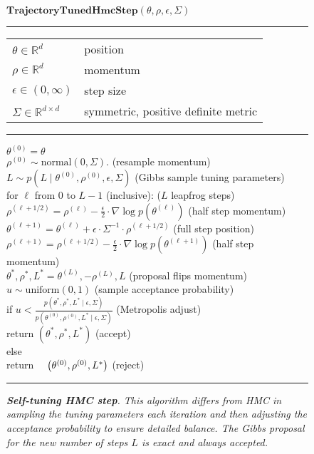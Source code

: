 \documentclass[ejs]{imsart}
\theoremstyle{plain}%
\theoremstyle{remark}
\begin{document}
\newcommand{\pos}[2]{#1^{(#2)}}
\begin{figure}
\begin{flushleft}
$\textbf{TrajectoryTunedHmcStep}(\theta, \rho, \epsilon, \Sigma)$
\vspace*{2pt}
\hrule
\vspace*{2pt}
\begin{tabular}{ll}
$\theta \in \mathbb{R}^d$ & position
\\[2pt]
$\rho \in \mathbb{R}^d$ & momentum
\\[2pt]
$\epsilon \in (0, \infty)$ & step size
\\[2pt]
$\Sigma \in \mathbb{R}^{d \times d}$ & symmetric, positive definite metric
\end{tabular}
\vspace*{2pt}
\hrule
\vspace*{6pt}
$\pos{\theta}{0} = \theta$
\\[4pt]
$\pos{\rho}{0} \sim \textrm{normal}(0, \Sigma).$ \hfill (resample momentum)
\\[4pt]
$L \sim p(L \mid \pos{\theta}{0}, \pos{\rho}{0}, \epsilon, \Sigma)$ \hfill (Gibbs sample tuning parameters)
\\[4pt]
for $\ell$ from $0$ to $L - 1$ (inclusive):  \hfill ($L$ leapfrog steps)
\\[-4pt]
\null \qquad $\pos{\rho}{\ell + 1/2} = \pos{\rho}{\ell} - \frac{\epsilon}{2} \cdot \nabla \log p(\pos{\theta}{\ell})$ \hfill (half step momentum)
\\[-4pt]
\null \qquad $\pos{\theta}{\ell + 1} = \pos{\theta}{\ell} + \epsilon \cdot \Sigma^{-1} \cdot \pos{\rho}{\ell + 1/2}$ \hfill (full step position)
\\[-4pt]
\null \qquad $\pos{\rho}{\ell + 1} = \pos{\rho}{\ell + 1/2} - \frac{\epsilon}{2} \cdot \nabla \log p(\pos{\theta}{\ell + 1})$ \hfill (half step momentum)
\\[6pt]
$\theta^*, \rho^*, L^* = \pos{\theta}{L}, -\pos{\rho}{L}, L$  \hfill (proposal flips momentum)
\\[4pt]
$u \sim \textrm{uniform}(0, 1)$ \hfill (sample acceptance probability)
\\[4pt]
if
$u < \frac{\displaystyle p(\theta^*, \rho^*,  L^* \mid \epsilon, \Sigma)}
         {\displaystyle p(\pos{\theta}{0}, \pos{\rho}{0}, L^* \mid \epsilon, \Sigma)}$
\hfill (Metropolis adjust)
\\
\null \quad return $\left(\theta^*, \rho^*, L^* \right)$ \hfill (accept)
\\[4pt]
else
\\[-6pt]
\null \quad return $\null \quad \left( \pos{\theta}{0}, \pos{\rho}{0}, L^* \right)$ \hfill (reject)
\hrule
\caption{\it {\bfseries Self-tuning HMC step}.  This algorithm differs from HMC in sampling the tuning parameters each iteration and then adjusting the acceptance probability to ensure detailed balance.  The Gibbs proposal for the new number of steps $L$ is exact and always accepted.}
\label{fig:self-tuning-hmc}
\end{flushleft}
\end{figure}
\end{document}
